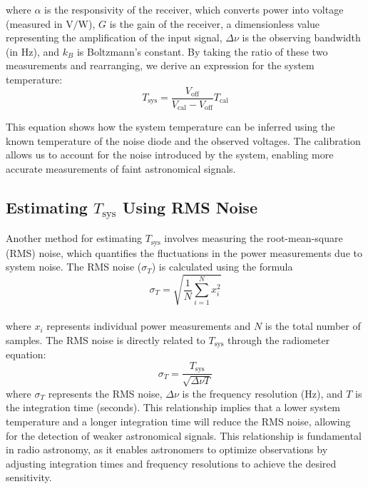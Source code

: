 \documentclass[linenumbers,twocolumn]{aastex631}
\begin{document}
where $\alpha$ is the responsivity of the receiver, which converts power into voltage (measured in $\text{V/W}$), $G$ is the gain of the receiver, a dimensionless value representing the amplification of the input signal, $\Delta \nu$ is the observing bandwidth (in Hz), and $k_{B}$ is Boltzmann's constant. By taking the ratio of these two measurements and rearranging, we derive an expression for the system temperature:
\begin{equation}
    T_{\text{sys}} = \frac{V_{\text{off}}}{V_{\text{cal}} - V_{\text{off}}} T_{\text{cal}}
\end{equation}

This equation shows how the system temperature can be inferred using the known temperature of the noise diode and the observed voltages. The calibration allows us to account for the noise introduced by the system, enabling more accurate measurements of faint astronomical signals.

\subsection{Estimating $T_{\text{sys}}$ Using RMS Noise}

Another method for estimating $T_{\text{sys}}$ involves measuring the root-mean-square (RMS) noise, which quantifies the fluctuations in the power measurements due to system noise. The RMS noise ($\sigma_{T}$) is calculated using the formula
\begin{equation}
    \sigma_{T} = \sqrt{\frac{1}{N} \sum_{i=1}^{N} x_{i}^{2}}
\end{equation} \\
where $x_{i}$ represents individual power measurements and $N$ is the total number of samples. The RMS noise is directly related to $T_{\text{sys}}$ through the radiometer equation:
\begin{equation}
    \sigma_{T} = \frac{T_{\text{sys}}}{\sqrt{\Delta \nu T}}
\end{equation} 
where $\sigma_{T}$ represents the RMS noise, $\Delta \nu$ is the frequency resolution (Hz), and $T$ is the integration time (seconds). This relationship implies that a lower system temperature and a longer integration time will reduce the RMS noise, allowing for the detection of weaker astronomical signals. This relationship is fundamental in radio astronomy, as it enables astronomers to optimize observations by adjusting integration times and frequency resolutions to achieve the desired sensitivity.
\end{document}
